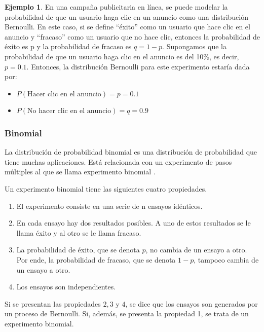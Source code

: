 \documentclass[
  11pt,
]{book}
\providecommand{\tightlist}{%
  \setlength{\itemsep}{0pt}\setlength{\parskip}{0pt}}
\theoremstyle{definition}
\theoremstyle{definition}
\newtheorem{example}{Ejemplo}[chapter]
\theoremstyle{definition}
\theoremstyle{definition}
\theoremstyle{remark}
\begin{document}
\begin{example}

En una campaña publicitaria en línea, se puede modelar la probabilidad de que un usuario haga clic en un anuncio como una distribución Bernoulli. En este caso, si se define ``éxito'' como un usuario que hace clic en el anuncio y ``fracaso'' como un usuario que no hace clic, entonces la probabilidad de éxito es p y la probabilidad de fracaso es \(q = 1 - p\). Supongamos que la probabilidad de que un usuario haga clic en el anuncio es del 10\%, es decir, \(p = 0.1\). Entonces, la distribución Bernoulli para este experimento estaría dada por:

\begin{itemize}
\tightlist
\item
  \(P(\text{Hacer clic en el anuncio}) = p = 0.1\)
\item
  \(P(\text{No hacer clic en el anuncio}) = q = 0.9\)
\end{itemize}

\end{example}

\subsubsection{Binomial}\label{binomial}

La distribución de probabilidad binomial es una distribución de probabilidad que tiene muchas aplicaciones. Está relacionada con un experimento de pasos múltiples al que se llama experimento binomial \citep[paǵina 200]{anderson}.

Un experimento binomial tiene las siguientes cuatro propiedades.

\begin{enumerate}
\def\labelenumi{\arabic{enumi}.}
\tightlist
\item
  El experimento consiste en una serie de n ensayos idénticos.
\item
  En cada ensayo hay dos resultados posibles. A uno de estos resultados se le llama éxito y al otro se le llama fracaso.
\item
  La probabilidad de éxito, que se denota \(p\), no cambia de un ensayo a otro. Por ende, la probabilidad de fracaso, que se denota \(1 - p\), tampoco cambia de un ensayo a otro.
\item
  Los ensayos son independientes.
\end{enumerate}

Si se presentan las propiedades \(2, 3\) y \(4\), se dice que los ensayos son generados por un proceso de Bernoulli. Si, además, se presenta la propiedad 1, se trata de un experimento binomial.
\end{document}
